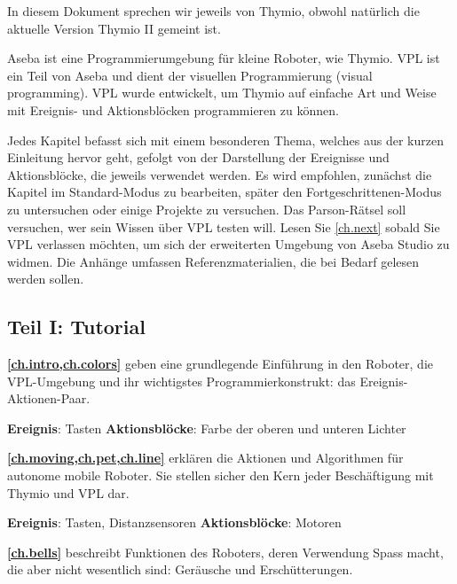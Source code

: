 In diesem Dokument sprechen wir jeweils von Thymio, obwohl natürlich die aktuelle Version Thymio II gemeint ist. 

Aseba ist eine Programmierumgebung für kleine Roboter, wie Thymio. VPL ist ein Teil von Aseba und dient der visuellen Programmierung (visual programming). VPL wurde entwickelt, um Thymio auf einfache Art und Weise mit Ereignis- und Aktionsblöcken programmieren zu können.

{}

Jedes Kapitel befasst sich mit einem besonderen Thema, welches aus der kurzen Einleitung hervor geht, gefolgt von der Darstellung der Ereignisse und Aktionsblöcke, die jeweils verwendet werden. Es wird empfohlen, zunächst die Kapitel im Standard-Modus zu bearbeiten, später den Fortgeschrittenen-Modus zu untersuchen oder einige Projekte zu versuchen. Das Parson-Rätsel soll versuchen, wer sein Wissen über VPL testen will. Lesen Sie \cref{ch.next} sobald Sie VPL verlassen möchten, um sich der erweiterten Umgebung von Aseba Studio zu widmen. Die Anhänge umfassen Referenzmaterialien, die bei Bedarf gelesen werden sollen. 

\subsection*{Teil I: Tutorial}

\textbf{\cref{ch.intro,ch.colors}} geben eine grundlegende Einführung in den Roboter, die VPL-Umgebung und ihr wichtigstes Programmierkonstrukt: das Ereignis-Aktionen-Paar.

\textbf{Ereignis}: Tasten \hfill \textbf{Aktionsblöcke}: Farbe der oberen und unteren Lichter

 \hfill {} \quad {}

\medskip

\textbf{\cref{ch.moving,ch.pet,ch.line}} erklären die Aktionen und Algorithmen für autonome mobile Roboter. Sie stellen sicher den Kern jeder Beschäftigung mit Thymio und VPL dar. 

\textbf{Ereignis}: Tasten, Distanzsensoren \hfill
\textbf{Aktionsblöcke}: Motoren

 \quad{}\quad {} \hfill
{}

\medskip

\textbf{\cref{ch.bells}} beschreibt Funktionen des Roboters, deren Verwendung Spass macht, die aber nicht wesentlich sind: Geräusche und Erschütterungen.

